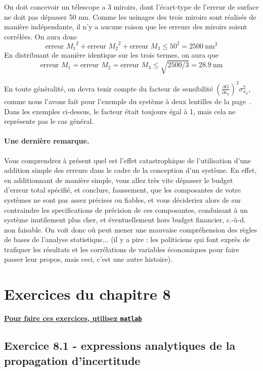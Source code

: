 On doit concevoir un télescope a 3 miroirs, dont l'écart-type de l'erreur de surface ne doit pas dépasser 50 nm. Comme les usinages des trois miroirs sont réalisés de manière indépendante, il n'y a aucune raison que les erreurs des miroirs soient corrélées. On aura donc
$$
    \text{erreur $M_1$}^2+\text{erreur $M_2$}^2+\text{erreur $M_3$}\le 50^2=2500\ \text{nm}^2
$$
En distribuant de manière identique sur les trois termes, on aura que
$$
    \text{erreur $M_1$}=\text{erreur $M_2$}=\text{erreur $M_3$}\le \sqrt{2500/3}=28.9\ \text{nm}
$$

En toute généralité, on devra tenir compte du facteur de sensibilité $\left(\frac{\partial G}{\partial x_k}\right)^2\sigma_{x_k}^2$, comme nous l'avons fait pour l'exemple du système à deux lentilles de la page~\pageref{sec:exopt}. Dans les exemples ci-dessus, le facteur était toujours égal à 1, mais cela ne représente pas le cas général.

\paragraph{Une dernière remarque.} Vous comprendrez à présent quel est l'effet catastrophique de l'utilisation d'une addition simple des erreurs dans le cadre de la conception d'un système. En effet, en additionnant de manière simple, vous allez très vite dépasser le budget d'erreur total spécifié, et conclure, faussement, que les composantes de votre systèmes ne sont pas assez précises ou fiables, et vous décideriez alors de sur contraindre les specifications de précision de ces composantes, conduisant à un système inutilement plus cher, et éventuellement hors budget financier, c.-à-d. non faisable. On voit donc où peut mener une mauvaise compréhension des règles de bases de l'analyse statistique... (il y a pire : les politiciens qui font exprès de trafiquer les résultats et les corrélations de variables économiques pour faire passer leur propos, mais ceci, c'est une autre histoire).

\section{Exercices du chapitre 8}

\begin{center}
    \Large \bf {\underline{Pour faire ces exercices, utilisez \texttt{matlab}}}
\end{center}

\subsection*{Exercice 8.1 - expressions analytiques de la propagation d'incertitude}

